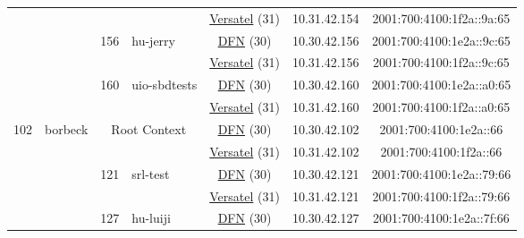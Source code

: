 \begin{small}
\begin{center}
\begin{longtable}{|c|c|c|c|c|c|c|c|}
  &  &  &  & \multicolumn{2}{|c|}{\tiny{\href{http://www.versatel.de}{Versatel} (31)}} & \tiny{10.31.42.154} & \tiny{2001:700:4100:1f2a::9a:65} \\* \cline{3-3}\cline{4-4}\cline{5-5}\cline{6-6}\cline{7-7}\cline{8-8}
  &  & \multirow{2}{*}{\tiny{156}} & \multicolumn{1}{|l|}{\multirow{2}{*}{\tiny{hu-jerry}}} & \multicolumn{2}{|c|}{\tiny{\href{https://www.dfn.de}{DFN} (30)}} & \tiny{10.30.42.156} & \tiny{2001:700:4100:1e2a::9c:65} \\* \cline{5-5}\cline{6-6}\cline{7-7}\cline{8-8}
  &  &  &  & \multicolumn{2}{|c|}{\tiny{\href{http://www.versatel.de}{Versatel} (31)}} & \tiny{10.31.42.156} & \tiny{2001:700:4100:1f2a::9c:65} \\* \cline{3-3}\cline{4-4}\cline{5-5}\cline{6-6}\cline{7-7}\cline{8-8}
  &  & \multirow{2}{*}{\tiny{160}} & \multicolumn{1}{|l|}{\multirow{2}{*}{\tiny{uio-sbdtests}}} & \multicolumn{2}{|c|}{\tiny{\href{https://www.dfn.de}{DFN} (30)}} & \tiny{10.30.42.160} & \tiny{2001:700:4100:1e2a::a0:65} \\* \cline{5-5}\cline{6-6}\cline{7-7}\cline{8-8}
  &  &  &  & \multicolumn{2}{|c|}{\tiny{\href{http://www.versatel.de}{Versatel} (31)}} & \tiny{10.31.42.160} & \tiny{2001:700:4100:1f2a::a0:65} \\ \hline
 \multirow{22}{*}{\tiny{102}} & \multicolumn{1}{|l|}{\multirow{22}{*}{\tiny{borbeck}}} & \multicolumn{2}{|c|}{\multirow{2}{*}{\tiny{Root Context}}} & \multicolumn{2}{|c|}{\tiny{\href{https://www.dfn.de}{DFN} (30)}} & \tiny{10.30.42.102} & \tiny{2001:700:4100:1e2a::66} \\* \cline{5-5}\cline{6-6}\cline{7-7}\cline{8-8}
  &  & \multicolumn{2}{|c|}{} & \multicolumn{2}{|c|}{\tiny{\href{http://www.versatel.de}{Versatel} (31)}} & \tiny{10.31.42.102} & \tiny{2001:700:4100:1f2a::66} \\* \cline{3-3}\cline{4-4}\cline{5-5}\cline{6-6}\cline{7-7}\cline{8-8}
  &  & \multirow{2}{*}{\tiny{121}} & \multicolumn{1}{|l|}{\multirow{2}{*}{\tiny{srl-test}}} & \multicolumn{2}{|c|}{\tiny{\href{https://www.dfn.de}{DFN} (30)}} & \tiny{10.30.42.121} & \tiny{2001:700:4100:1e2a::79:66} \\* \cline{5-5}\cline{6-6}\cline{7-7}\cline{8-8}
  &  &  &  & \multicolumn{2}{|c|}{\tiny{\href{http://www.versatel.de}{Versatel} (31)}} & \tiny{10.31.42.121} & \tiny{2001:700:4100:1f2a::79:66} \\* \cline{3-3}\cline{4-4}\cline{5-5}\cline{6-6}\cline{7-7}\cline{8-8}
  &  & \multirow{2}{*}{\tiny{127}} & \multicolumn{1}{|l|}{\multirow{2}{*}{\tiny{hu-luiji}}} & \multicolumn{2}{|c|}{\tiny{\href{https://www.dfn.de}{DFN} (30)}} & \tiny{10.30.42.127} & \tiny{2001:700:4100:1e2a::7f:66} \\* \cline{5-5}\cline{6-6}\cline{7-7}\cline{8-8}

\end{longtable}
\end{center}
\end{small}
